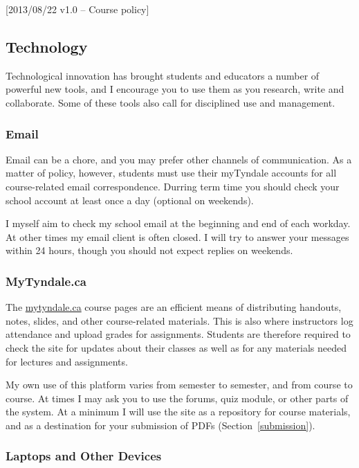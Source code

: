 [2013/08/22 v1.0 -- Course policy]

\subsection{Technology}
\label{technology}

Technological innovation has brought students and educators a number of
powerful new tools, and I encourage you to use them as you research, write and
collaborate. Some of these tools also call for disciplined use and management.

\subsubsection{Email}
\label{email}

Email can be a chore, and you may prefer other channels of communication. As a
matter of policy, however, students must use their myTyndale accounts for all
course-related email correspondence. Durring term time you should check your
school account at least once a day (optional on weekends).

I myself aim to check my school email at the beginning and end of each workday.
At other times my email client is often closed. I will try to answer your
messages within 24 hours, though you should not expect replies on weekends.

\subsubsection{MyTyndale.ca}
\label{mytyndale}

The \href{http://mytyndale.ca}{mytyndale.ca} course pages are an efficient
means of distributing handouts, notes, slides, and other course-related
materials. This is also where instructors log attendance and upload grades for
assignments. Students are therefore required to check the site for updates
about their classes as well as for any materials needed for lectures and
assignments.

My own use of this platform varies from semester to semester, and from
course to course. At times I may ask you to use the forums, quiz module, or
other parts of the system. At a minimum I will use the site as a repository
for course materials, and as a destination for your submission of PDFs
(Section~\ref{submission}).

\subsubsection{Laptops and Other Devices}
\label{laptops}

